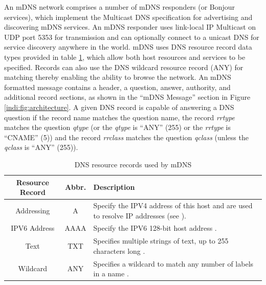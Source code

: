 An mDNS network comprises a number of mDNS responders (or Bonjour services), which implement the Multicast DNS specification for advertising and discovering mDNS services.  An mDNS responder uses link-local IP Multicast on UDP port 5353 for transmission and can optionally connect to a unicast DNS for service discovery anywhere in the world. mDNS uses DNS resource record data types provided in table \ref{table:resource:record}, which allow both host resources and services to be specified. Records can also use the DNS wildcard resource record (ANY) for matching  thereby enabling the ability to browse the network.  An mDNS formatted message contains a header, a question, answer, authority, and additional record sections, as shown in the ``mDNS Message'' section in Figure \ref{indi:fig:architecture}.   A given DNS record is capable of answering a DNS question if the record name matches the question name, the record \emph{rrtype} matches the question  \emph{qtype} (or the \emph{ qtype} is ``ANY'' (255) or the  \emph{rrtype} is ``CNAME'' (5)) and the record  \emph{ rrclass} matches the question  \emph{qclass} (unless the  \emph{qclass} is ``ANY'' (255)). 

\footnotesize
\begin{table}[h]
\caption{DNS resource records used by mDNS}
\label{table:resource:record}
\begin{center}
\begin{tabular}{| c | c  | p{7.5cm} |}

\hline \textbf{Resource Record} & \textbf{Abbr.} & \textbf{Description}\\

\hline Addressing & A &  Specify the IPV4 address of this host and are used to resolve IP addresses (see \cite{rfc1035}).\\

\hline

IPV6 Address & AAAA & Specify the IPV6 128-bit host address \cite{rfc1886}.\\
\hline

\hline
Text  & TXT & 

Specifies multiple strings of text, up to 255 characters long \cite{rfc1035}. \\

\hline
Wildcard  & ANY & 

Specifies a wildcard to match any number of labels in a name \cite{rfc4592}. \\
\hline

\end{tabular}
\end{center}
\end{table}
\normalsize


